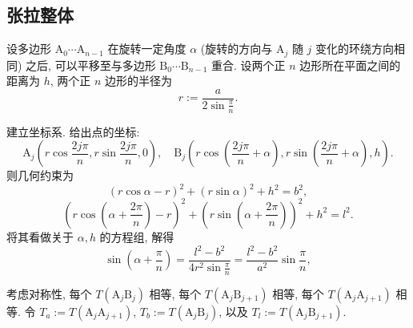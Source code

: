 \documentclass{article}
\begin{document}
\subsection{张拉整体}

设多边形 $\mathrm A_0\cdots\mathrm A_{n-1}$ 在旋转一定角度 $\alpha$
(旋转的方向与 $\mathrm A_j$ 随 $j$ 变化的环绕方向相同) 之后,
可以平移至与多边形 $\mathrm B_0\cdots\mathrm B_{n-1}$ 重合.
设两个正 $n$ 边形所在平面之间的距离为 $h$,
两个正 $n$ 边形的半径为
\begin{equation}
	r:=\frac a{2\sin\frac\pi n}.
\end{equation}

建立坐标系. 给出点的坐标:
\begin{equation}
	\mathrm A_j\left(r\cos\frac{2j\pi}n,r\sin\frac{2j\pi}n,0\right),
	\quad\mathrm B_j\left(r\cos\!\left(\frac{2j\pi}n+\alpha\right),r\sin\!\left(\frac{2j\pi}n+\alpha\right),h\right).
\end{equation}
则几何约束为
\begin{equation}
	\left(r\cos\alpha-r\right)^2+\left(r\sin\alpha\right)^2+h^2=b^2,
\end{equation}
\begin{equation}
	\left(r\cos\!\left(\alpha+\frac{2\pi}n\right)-r\right)^2
	+\left(r\sin\!\left(\alpha+\frac{2\pi}n\right)\right)^2+h^2=l^2.
\end{equation}
将其看做关于 $\alpha,h$ 的方程组, 解得
\begin{equation}
	\sin\!\left(\alpha+\frac\pi n\right)
	=\frac{l^2-b^2}{4r^2\sin\frac\pi n}
	=\frac{l^2-b^2}{a^2}\sin\frac\pi n,
	\label{eq:几何约束三角方程}
\end{equation}

考虑对称性, 每个 $T\!\left(\mathrm A_j\mathrm B_j\right)$ 相等,
每个 $T\!\left(\mathrm A_j\mathrm B_{j+1}\right)$ 相等,
每个 $T\!\left(\mathrm A_j\mathrm A_{j+1}\right)$ 相等.
令 $T_a:=T\!\left(\mathrm A_j\mathrm A_{j+1}\right)$,
$T_b:=T\!\left(\mathrm A_j\mathrm B_j\right)$,
以及 $T_l:=T\!\left(\mathrm A_j\mathrm B_{j+1}\right)$.
\end{document}
